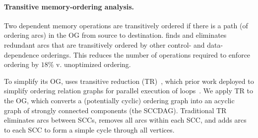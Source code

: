 \paragraph{Transitive memory-ordering analysis.}
Two dependent memory operations are transitively ordered if there is a path (of
ordering arcs) in the OG from source to destination.
%
\riptide finds and eliminates redundant arcs that are
transitively ordered by other control- and data-dependence orderings.
%
%
%
%
%
%
%
This reduces the number of operations required to enforce ordering by $18\%$ v. unoptimized ordering.

To simplify its OG, \riptide uses transitive reduction (TR)~\cite{aho-tr}, which prior work
deployed to simplify ordering relation graphs for parallel
execution of loops~\cite{midkiff-padua,compiler-sync}.
%
%
%
%
%
We apply TR to the OG, which converts a (potentially cyclic) ordering 
graph into an acyclic graph of strongly connected components (the SCCDAG). 
%
Traditional TR eliminates arcs between SCCs,
removes all arcs within each SCC,
and adds arcs to each SCC to form a simple cycle through all vertices.

